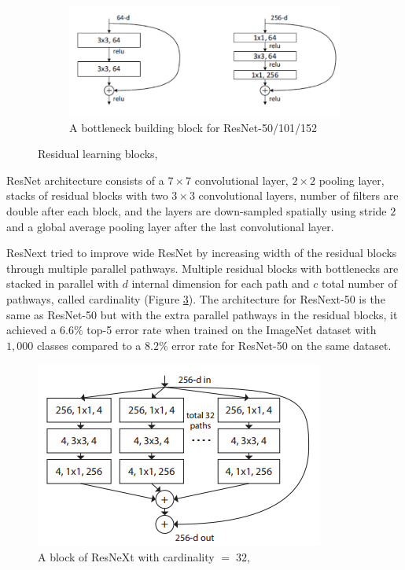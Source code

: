 \documentclass{beamer}
\begin{document}
\begin{frame}[allowframebreaks]
\begin{figure}[H]
	\begin{subfigure}[t]{\textwidth}
	\centering
	\includegraphics[scale=0.5]{png/bottleneck.png}		
	\caption{A bottleneck building block for ResNet-50/101/152}	 
	\label{subfig:bottleneck}
	\end{subfigure}
\caption[Residual learning blocks]{Residual learning blocks, }	 
\label{fig:residual_learning}
\end{figure} \noindent
ResNet architecture consists of a $7 \times 7$ convolutional layer, $2 \times 2$ pooling layer, stacks of residual blocks with two $3 \times 3$ convolutional layers, number of filters are double after each block, and the layers are down-sampled spatially using stride $2$ and a global average pooling layer after the last convolutional layer.

ResNext {\cite{Xie}} tried to improve wide ResNet {\cite{zagoruyko2017wide}} by increasing width of the residual blocks through multiple parallel pathways. Multiple residual blocks with bottlenecks are stacked in parallel with $d$ internal dimension for each path and $c$ total number of pathways, called cardinality (Figure \ref{fig:resnext}). The architecture for ResNext-50 is the same as ResNet-50 but with the extra parallel pathways in the residual blocks, it achieved a $6.6\%$ top-5 error rate when trained on the ImageNet dataset with $1,000$ classes compared to a $8.2\%$ error rate for ResNet-50 on the same dataset.
\begin{figure}[H]
\centering
\includegraphics[scale=0.7]{png/resnext.png}
\caption[A block of ResNeXt with cardinality = 32]{A block of ResNeXt with cardinality $= \;32$, }	
\label{fig:resnext}
\end{figure} 
\end{frame}
\end{document}
